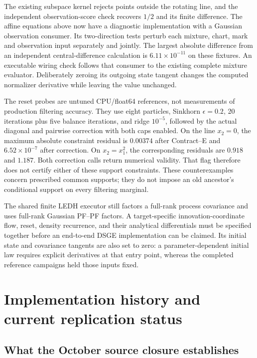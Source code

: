 \documentclass[11pt]{article}
\begin{document}
The existing subspace kernel rejects points outside the rotating line,
and the independent observation-score check
recovers $1/2$ and its finite difference.  The affine equations above now have
a diagnostic implementation with a Gaussian observation consumer.  Its
two-direction tests perturb each mixture, chart, mark and observation input
separately and jointly.  The largest absolute difference from an independent
central-difference calculation is $6.11\times10^{-11}$ on these fixtures.
An executable wiring check follows that consumer to the existing complete
mixture evaluator.  Deliberately zeroing its outgoing state tangent changes
the computed normalizer derivative while leaving the value unchanged.

The reset probes are untuned CPU/float64 references, not measurements of
production filtering accuracy.  They use eight particles, Sinkhorn
$\epsilon=0.2$, 20 iterations plus five balance iterations, and ridge
$10^{-5}$, followed by the actual diagonal and pairwise correction with both
caps enabled.  On the line $x_2=0$, the maximum absolute constraint residual
is $0.00374$ after Contract--E and $6.52\times10^{-7}$ after correction.  On
$x_2=x_1^2$, the corresponding residuals are $0.918$ and $1.187$.  Both
correction calls return numerical validity.  That flag therefore does not
certify either of these support constraints.  These counterexamples concern
prescribed common supports; they do not impose an old ancestor's conditional
support on every filtering marginal.

The shared finite
LEDH executor still factors a full-rank process covariance and uses full-rank
Gaussian PF--PF factors.  A target-specific innovation-coordinate flow,
reset, density recurrence, and their analytical differentials must be
specified together before an end-to-end DSGE implementation can be claimed.
Its initial state and covariance tangents are also set to zero: a
parameter-dependent initial law requires explicit derivatives at that entry
point, whereas the completed reference campaigns held those inputs fixed.

\section{Implementation history and current replication status}
\label{sec:implementation}

\subsection{What the October source closure establishes}
\end{document}
